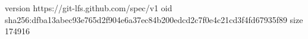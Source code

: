 version https://git-lfs.github.com/spec/v1
oid sha256:dfba13abec93e765d2f904e6a37ec84b200edcd2c7f0e4c21cd3f4fd67935f89
size 174916
